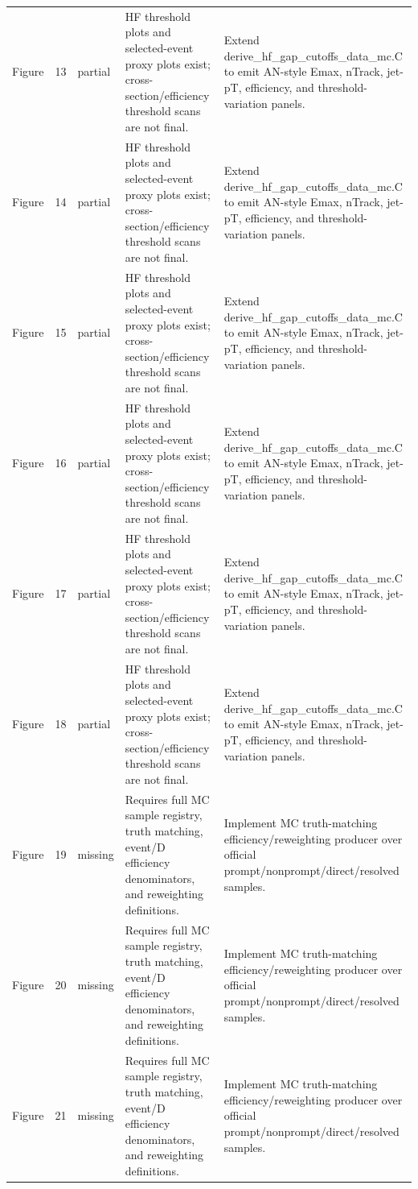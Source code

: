 \documentclass[11pt]{article}
\begin{document}
\begin{longtable}{lll p{} p{}}
Figure & 13 & partial & HF threshold plots and selected-event proxy plots exist; cross-section/efficiency threshold scans are not final. & Extend derive\_hf\_gap\_cutoffs\_data\_mc.C to emit AN-style Emax, nTrack, jet-pT, efficiency, and threshold-variation panels. \\
Figure & 14 & partial & HF threshold plots and selected-event proxy plots exist; cross-section/efficiency threshold scans are not final. & Extend derive\_hf\_gap\_cutoffs\_data\_mc.C to emit AN-style Emax, nTrack, jet-pT, efficiency, and threshold-variation panels. \\
Figure & 15 & partial & HF threshold plots and selected-event proxy plots exist; cross-section/efficiency threshold scans are not final. & Extend derive\_hf\_gap\_cutoffs\_data\_mc.C to emit AN-style Emax, nTrack, jet-pT, efficiency, and threshold-variation panels. \\
Figure & 16 & partial & HF threshold plots and selected-event proxy plots exist; cross-section/efficiency threshold scans are not final. & Extend derive\_hf\_gap\_cutoffs\_data\_mc.C to emit AN-style Emax, nTrack, jet-pT, efficiency, and threshold-variation panels. \\
Figure & 17 & partial & HF threshold plots and selected-event proxy plots exist; cross-section/efficiency threshold scans are not final. & Extend derive\_hf\_gap\_cutoffs\_data\_mc.C to emit AN-style Emax, nTrack, jet-pT, efficiency, and threshold-variation panels. \\
Figure & 18 & partial & HF threshold plots and selected-event proxy plots exist; cross-section/efficiency threshold scans are not final. & Extend derive\_hf\_gap\_cutoffs\_data\_mc.C to emit AN-style Emax, nTrack, jet-pT, efficiency, and threshold-variation panels. \\
Figure & 19 & missing & Requires full MC sample registry, truth matching, event/D efficiency denominators, and reweighting definitions. & Implement MC truth-matching efficiency/reweighting producer over official prompt/nonprompt/direct/resolved samples. \\
Figure & 20 & missing & Requires full MC sample registry, truth matching, event/D efficiency denominators, and reweighting definitions. & Implement MC truth-matching efficiency/reweighting producer over official prompt/nonprompt/direct/resolved samples. \\
Figure & 21 & missing & Requires full MC sample registry, truth matching, event/D efficiency denominators, and reweighting definitions. & Implement MC truth-matching efficiency/reweighting producer over official prompt/nonprompt/direct/resolved samples. \\

\end{longtable}
\end{document}

